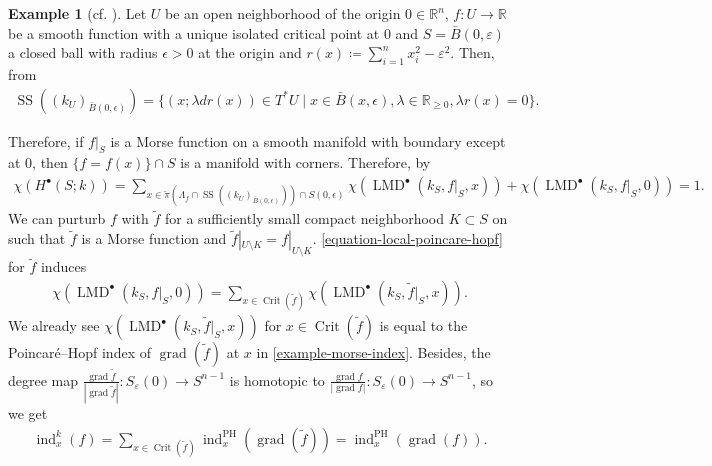 \documentclass[a4paper,dvipdfmx,reqno,12pt]{amsart}
\theoremstyle{definition}
\newtheorem{example}[theorem]{Example}
\newcommand{\deq}{\coloneqq}
\newcommand{\opn}[1]{\operatorname{#1}}
\numberwithin{equation}{section}
\begin{document}
\begin{example}[{cf. \cite[3.2]{MR3779558}}]
Let $U$ be an open neighborhood of the origin 
$0\in \mathbb{R}^{n}$,
$f\colon U\to \mathbb{R}$ be a smooth 
function 
with a unique isolated critical point at $0$ and 
$S=\bar{B}(0,\varepsilon)$ a closed ball with radius 
$\epsilon >0$ at the origin and 
$r(x)\deq \sum_{i=1}^{n}x_i^{2}-\varepsilon^{2}$.
Then, from \cite[Proposition 5.3.3]{MR1299726}
\begin{align}
\opn{SS}((k_{U})_{\bar{B}(0,\epsilon)})=
\{(x;\lambda dr(x))\in T^*U\mid x\in \bar{B}(x,\epsilon), 
\lambda\in \mathbb{R}_{\geq 0}, \lambda r(x)=0\}.
\end{align}

Therefore, if $f|_{S}$ is 
a Morse function on a smooth manifold with boundary except 
at $0$, then $\{f=f(x)\}\cap S$ is a manifold with corners.
Therefore, 
 by 
\cite[Proposition 5.4.20]{MR1299726}
\begin{align} \label{equation-local-poincare-hopf}
\chi(H^{\bullet}(S;k))=
\sum_{x\in \check{\pi}(\Lambda_f\cap 
\opn{SS}((k_{U})_{\bar{B}(0,\epsilon)}))\cap S(0,\epsilon)}
\chi(\opn{LMD}^{\bullet}(k_{S},f|_S,x))
+\chi(\opn{LMD}^{\bullet}(k_{S},f|_S,0))=1.
\end{align}
We can purturb $f$ with $\tilde{f}$ for a sufficiently 
small compact neighborhood $K \subset S$ on such that 
$\tilde{f}$ is a Morse function and 
$\tilde{f}|_{U\setminus K}=f|_{U\setminus K}$.
\cref{equation-local-poincare-hopf} for $\tilde{f}$
induces 
\begin{align}
\chi(\opn{LMD}^{\bullet}(k_{S},f|_S,0))
=\sum_{x\in \opn{Crit}(\tilde{f})}
\chi(\opn{LMD}^{\bullet}(k_{S},\tilde{f}|_S,x)).
\end{align}
We already see 
$\chi(\opn{LMD}^{\bullet}(k_{S},\tilde{f}|_S,x))$
for $x\in \opn{Crit}(\tilde{f})$
is equal to the Poincar\'e--Hopf index of 
$\opn{grad}(\tilde{f})$ at $x$ in 
\cref{example-morse-index}.
Besides, the degree map 
$\frac{\opn{grad}\tilde{f}}{|\opn{grad}\tilde{f}|}\colon 
S_{\varepsilon}(0) \to S^{n-1}$ is 
homotopic to $\frac{\opn{grad}f}{|\opn{grad}f|}\colon 
S_{\varepsilon}(0) \to S^{n-1}$, so we get 
\begin{align}
\opn{ind}_x^{k}(f)=
\sum_{x\in \opn{Crit}(\tilde{f})}
\opn{ind}^{\opn{PH}}_x(\opn{grad}(\tilde{f}))=
\opn{ind}^{\opn{PH}}_x(\opn{grad}(f)).
\end{align}

\end{example}
\end{document}
